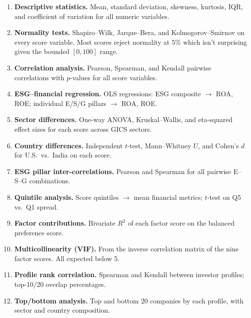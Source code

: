\begin{enumerate}
    \item \textbf{Descriptive statistics.} Mean, standard deviation, skewness, kurtosis, IQR, and coefficient of variation for all numeric variables.

    \item \textbf{Normality tests.} Shapiro--Wilk, Jarque--Bera, and Kolmogorov--Smirnov on every score variable. Most scores reject normality at 5\% which isn't surprising given the bounded $[0, 100]$ range.

    \item \textbf{Correlation analysis.} Pearson, Spearman, and Kendall pairwise correlations with $p$-values for all score variables.

    \item \textbf{ESG--financial regression.} OLS regressions: ESG composite $\rightarrow$ ROA, ROE; individual E/S/G pillars $\rightarrow$ ROA, ROE.

    \item \textbf{Sector differences.} One-way ANOVA, Kruskal--Wallis, and eta-squared effect sizes for each score across GICS sectors.

    \item \textbf{Country differences.} Independent $t$-test, Mann--Whitney $U$, and Cohen's $d$ for U.S.\ vs.\ India on each score.

    \item \textbf{ESG pillar inter-correlations.} Pearson and Spearman for all pairwise E--S--G combinations.

    \item \textbf{Quintile analysis.} Score quintiles $\rightarrow$ mean financial metrics; $t$-test on Q5 vs.\ Q1 spread.

    \item \textbf{Factor contributions.} Bivariate $R^2$ of each factor score on the balanced preference score.

    \item \textbf{Multicollinearity (VIF).} From the inverse correlation matrix of the nine factor scores. All expected below 5.

    \item \textbf{Profile rank correlation.} Spearman and Kendall between investor profiles; top-10/20 overlap percentages.

    \item \textbf{Top/bottom analysis.} Top and bottom 20 companies by each profile, with sector and country composition.


\end{enumerate}

